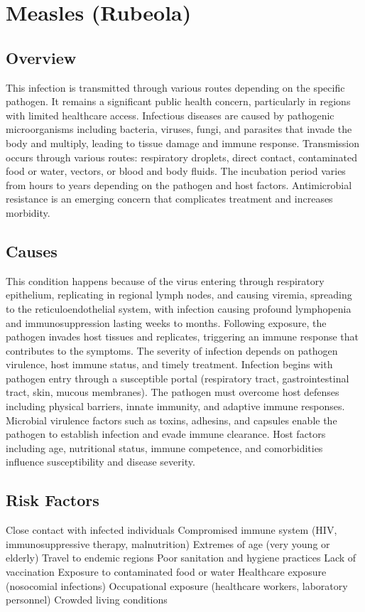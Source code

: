 \chapter{Measles (Rubeola)}
\label{sec:Measles}

\section{Overview}
This infection is transmitted through various routes depending on the specific pathogen. It remains a significant public health concern, particularly in regions with limited healthcare access. Infectious diseases are caused by pathogenic microorganisms including bacteria, viruses, fungi, and parasites that invade the body and multiply, leading to tissue damage and immune response. Transmission occurs through various routes: respiratory droplets, direct contact, contaminated food or water, vectors, or blood and body fluids. The incubation period varies from hours to years depending on the pathogen and host factors. Antimicrobial resistance is an emerging concern that complicates treatment and increases morbidity.
\section{Causes}
This condition happens because of the virus entering through respiratory epithelium, replicating in regional lymph nodes, and causing viremia, spreading to the reticuloendothelial system, with infection causing profound lymphopenia and immunosuppression lasting weeks to months. Following exposure, the pathogen invades host tissues and replicates, triggering an immune response that contributes to the symptoms. The severity of infection depends on pathogen virulence, host immune status, and timely treatment. Infection begins with pathogen entry through a susceptible portal (respiratory tract, gastrointestinal tract, skin, mucous membranes). The pathogen must overcome host defenses including physical barriers, innate immunity, and adaptive immune responses. Microbial virulence factors such as toxins, adhesins, and capsules enable the pathogen to establish infection and evade immune clearance. Host factors including age, nutritional status, immune competence, and comorbidities influence susceptibility and disease severity.
\section{Risk Factors}
Close contact with infected individuals Compromised immune system (HIV, immunosuppressive therapy, malnutrition) Extremes of age (very young or elderly) Travel to endemic regions Poor sanitation and hygiene practices Lack of vaccination Exposure to contaminated food or water Healthcare exposure (nosocomial infections) Occupational exposure (healthcare workers, laboratory personnel) Crowded living conditions

